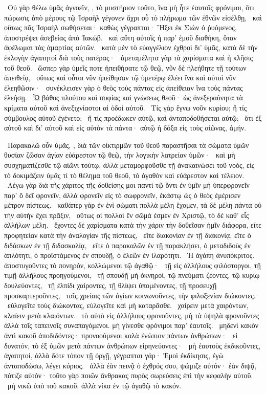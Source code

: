 ~Οὐ γὰρ θέλω ὑμᾶς ἀγνοεῖν, , τὸ μυστήριον τοῦτο, ἵνα μὴ ἦτε ἑαυτοῖς φρόνιμοι, ὅτι πώρωσις ἀπὸ μέρους τῷ Ἰσραὴλ γέγονεν ἄχρι οὗ τὸ πλήρωμα τῶν ἐθνῶν εἰσέλθῃ,
~καὶ οὕτως πᾶς Ἰσραὴλ σωθήσεται· καθὼς γέγραπται· Ἥξει ἐκ Σιὼν ὁ ῥυόμενος, ἀποστρέψει ἀσεβείας ἀπὸ Ἰακώβ.
~καὶ αὕτη αὐτοῖς ἡ παρ’ ἐμοῦ διαθήκη, ὅταν ἀφέλωμαι τὰς ἁμαρτίας αὐτῶν.
~κατὰ μὲν τὸ εὐαγγέλιον ἐχθροὶ δι’ ὑμᾶς, κατὰ δὲ τὴν ἐκλογὴν ἀγαπητοὶ διὰ τοὺς πατέρας·
~ἀμεταμέλητα γὰρ τὰ χαρίσματα καὶ ἡ κλῆσις τοῦ θεοῦ.
~ὥσπερ γὰρ ὑμεῖς ποτε ἠπειθήσατε τῷ θεῷ, νῦν δὲ ἠλεήθητε τῇ τούτων ἀπειθείᾳ,
~οὕτως καὶ οὗτοι νῦν ἠπείθησαν τῷ ὑμετέρῳ ἐλέει ἵνα καὶ αὐτοὶ νῦν ἐλεηθῶσιν·
~συνέκλεισεν γὰρ ὁ θεὸς τοὺς πάντας εἰς ἀπείθειαν ἵνα τοὺς πάντας ἐλεήσῃ.
~Ὦ βάθος πλούτου καὶ σοφίας καὶ γνώσεως θεοῦ· ὡς ἀνεξεραύνητα τὰ κρίματα αὐτοῦ καὶ ἀνεξιχνίαστοι αἱ ὁδοὶ αὐτοῦ.
~Τίς γὰρ ἔγνω νοῦν κυρίου; ἢ τίς σύμβουλος αὐτοῦ ἐγένετο;
~ἢ τίς προέδωκεν αὐτῷ, καὶ ἀνταποδοθήσεται αὐτῷ;
~ὅτι ἐξ αὐτοῦ καὶ δι’ αὐτοῦ καὶ εἰς αὐτὸν τὰ πάντα· αὐτῷ ἡ δόξα εἰς τοὺς αἰῶνας, ἀμήν.

~Παρακαλῶ οὖν ὑμᾶς, , διὰ τῶν οἰκτιρμῶν τοῦ θεοῦ παραστῆσαι τὰ σώματα ὑμῶν θυσίαν ζῶσαν ἁγίαν εὐάρεστον τῷ θεῷ, τὴν λογικὴν λατρείαν ὑμῶν·
~καὶ μὴ συσχηματίζεσθε τῷ αἰῶνι τούτῳ, ἀλλὰ μεταμορφοῦσθε τῇ ἀνακαινώσει τοῦ νοός, εἰς τὸ δοκιμάζειν ὑμᾶς τί τὸ θέλημα τοῦ θεοῦ, τὸ ἀγαθὸν καὶ εὐάρεστον καὶ τέλειον.
~Λέγω γὰρ διὰ τῆς χάριτος τῆς δοθείσης μοι παντὶ τῷ ὄντι ἐν ὑμῖν μὴ ὑπερφρονεῖν παρ’ ὃ δεῖ φρονεῖν, ἀλλὰ φρονεῖν εἰς τὸ σωφρονεῖν, ἑκάστῳ ὡς ὁ θεὸς ἐμέρισεν μέτρον πίστεως.
~καθάπερ γὰρ ἐν ἑνὶ σώματι πολλὰ μέλη ἔχομεν, τὰ δὲ μέλη πάντα οὐ τὴν αὐτὴν ἔχει πρᾶξιν,
~οὕτως οἱ πολλοὶ ἓν σῶμά ἐσμεν ἐν Χριστῷ, τὸ δὲ καθ’ εἷς ἀλλήλων μέλη.
~ἔχοντες δὲ χαρίσματα κατὰ τὴν χάριν τὴν δοθεῖσαν ἡμῖν διάφορα, εἴτε προφητείαν κατὰ τὴν ἀναλογίαν τῆς πίστεως,
~εἴτε διακονίαν ἐν τῇ διακονίᾳ, εἴτε ὁ διδάσκων ἐν τῇ διδασκαλίᾳ,
~εἴτε ὁ παρακαλῶν ἐν τῇ παρακλήσει, ὁ μεταδιδοὺς ἐν ἁπλότητι, ὁ προϊστάμενος ἐν σπουδῇ, ὁ ἐλεῶν ἐν ἱλαρότητι.
~Ἡ ἀγάπη ἀνυπόκριτος. ἀποστυγοῦντες τὸ πονηρόν, κολλώμενοι τῷ ἀγαθῷ·
~τῇ  εἰς ἀλλήλους φιλόστοργοι, τῇ τιμῇ ἀλλήλους προηγούμενοι,
~τῇ σπουδῇ μὴ ὀκνηροί, τῷ πνεύματι ζέοντες, τῷ κυρίῳ δουλεύοντες,
~τῇ ἐλπίδι χαίροντες, τῇ θλίψει ὑπομένοντες, τῇ προσευχῇ προσκαρτεροῦντες,
~ταῖς χρείαις τῶν ἁγίων κοινωνοῦντες, τὴν φιλοξενίαν διώκοντες.
~εὐλογεῖτε τοὺς διώκοντας, εὐλογεῖτε καὶ μὴ καταρᾶσθε.
~χαίρειν μετὰ χαιρόντων, κλαίειν μετὰ κλαιόντων.
~τὸ αὐτὸ εἰς ἀλλήλους φρονοῦντες, μὴ τὰ ὑψηλὰ φρονοῦντες ἀλλὰ τοῖς ταπεινοῖς συναπαγόμενοι. μὴ γίνεσθε φρόνιμοι παρ’ ἑαυτοῖς.
~μηδενὶ κακὸν ἀντὶ κακοῦ ἀποδιδόντες· προνοούμενοι καλὰ ἐνώπιον πάντων ἀνθρώπων·
~εἰ δυνατόν, τὸ ἐξ ὑμῶν μετὰ πάντων ἀνθρώπων εἰρηνεύοντες·
~μὴ ἑαυτοὺς ἐκδικοῦντες, ἀγαπητοί, ἀλλὰ δότε τόπον τῇ ὀργῇ, γέγραπται γάρ· Ἐμοὶ ἐκδίκησις, ἐγὼ ἀνταποδώσω, λέγει κύριος.
~ἀλλὰ ἐὰν πεινᾷ ὁ ἐχθρός σου, ψώμιζε αὐτόν· ἐὰν διψᾷ, πότιζε αὐτόν· τοῦτο γὰρ ποιῶν ἄνθρακας πυρὸς σωρεύσεις ἐπὶ τὴν κεφαλὴν αὐτοῦ.
~μὴ νικῶ ὑπὸ τοῦ κακοῦ, ἀλλὰ νίκα ἐν τῷ ἀγαθῷ τὸ κακόν.

